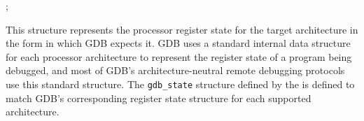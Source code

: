 \label{gdb-state}
\begin{apisyn}

	;
\end{apisyn}
\begin{apidesc}
	This structure represents the processor register state
	for the target architecture
	in the form in which GDB expects it.
	GDB uses a standard internal data structure
	for each processor architecture
	to represent the register state of a program being debugged,
	and most of GDB's architecture-neutral remote debugging protocols
	use this standard structure.
	The {\tt gdb_state} structure defined by the \oskit{}
	is defined to match GDB's corresponding register state structure
	for each supported architecture.
\end{apidesc}

